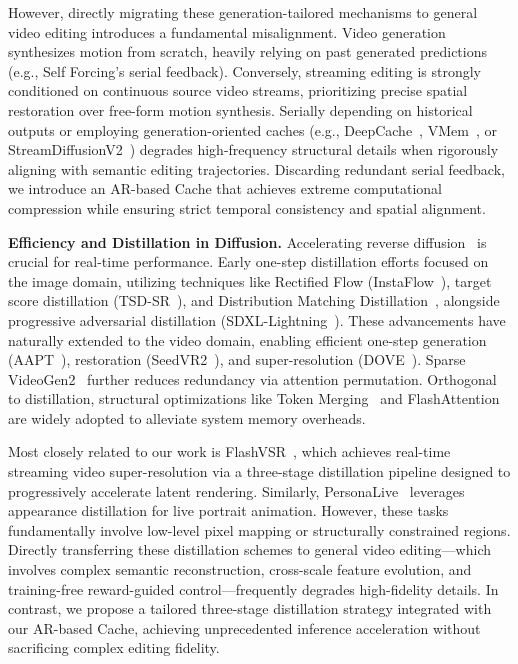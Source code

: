 However, directly migrating these generation-tailored mechanisms to general video editing introduces a fundamental misalignment. Video generation synthesizes motion from scratch, heavily relying on past generated predictions (e.g., Self Forcing's serial feedback). Conversely, streaming editing is strongly conditioned on continuous source video streams, prioritizing precise spatial restoration over free-form motion synthesis. Serially depending on historical outputs or employing generation-oriented caches (e.g., DeepCache~\cite{ma2024deepcache}, VMem~\cite{li2025vmem}, or StreamDiffusionV2~\cite{feng2025streamdiffusionv2}) degrades high-frequency structural details when rigorously aligning with semantic editing trajectories. Discarding redundant serial feedback, we introduce an AR-based Cache that achieves extreme computational compression while ensuring strict temporal consistency and spatial alignment.

\noindent \textbf{Efficiency and Distillation in Diffusion.}
\label{subsec:distillation}
Accelerating reverse diffusion~\cite{song2023consistencymodels,wang2023videolcm,salimans2022progressive, zheng2025compute, liu2025survey, zheng2026forecast} is crucial for real-time performance. Early one-step distillation efforts focused on the image domain, utilizing techniques like Rectified Flow (InstaFlow~\cite{liu2023instaflow}), target score distillation (TSD-SR~\cite{Dong_2025_CVPR}), and Distribution Matching Distillation~\cite{yin2024improved,yin2025slow}, alongside progressive adversarial distillation (SDXL-Lightning~\cite{lin2024sdxl}). These advancements have naturally extended to the video domain, enabling efficient one-step generation (AAPT~\cite{lin2025diffusion}), restoration (SeedVR2~\cite{wang2025seedvr2}), and super-resolution (DOVE~\cite{chen2025doveefficientonestepdiffusion}). Sparse VideoGen2~\cite{yang2025sparsevideogen2acceleratevideo} further reduces redundancy via attention permutation. Orthogonal to distillation, structural optimizations like Token Merging~\cite{bolya2022token} and FlashAttention~\cite{dao2022flashattention} are widely adopted to alleviate system memory overheads.

Most closely related to our work is FlashVSR~\cite{zhuang2025flashvsr}, which achieves real-time streaming video super-resolution via a three-stage distillation pipeline designed to progressively accelerate latent rendering. Similarly, PersonaLive~\cite{li2025personalive} leverages appearance distillation for live portrait animation. However, these tasks fundamentally involve low-level pixel mapping or structurally constrained regions. Directly transferring these distillation schemes to general video editing—which involves complex semantic reconstruction, cross-scale feature evolution, and training-free reward-guided control—frequently degrades high-fidelity details. In contrast, we propose a tailored three-stage distillation strategy integrated with our AR-based Cache, achieving unprecedented inference acceleration without sacrificing complex editing fidelity.